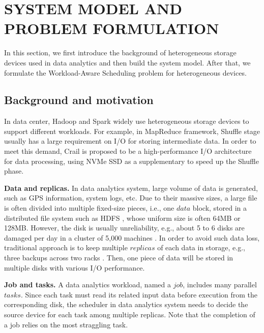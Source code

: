 \documentclass[conference]{IEEEtran}
\begin{document}
\section{SYSTEM MODEL AND PROBLEM FORMULATION}\label{SYSTEM_MODEL}
In this section, we first introduce the background of heterogeneous storage devices used in data analytics and then build the system model. After that, we formulate the Workload-Aware Scheduling problem for heterogeneous devices.

\subsection{Background and motivation}\label{AA}

In data center, Hadoop and Spark widely use heterogeneous storage devices to support different workloads. For example, in MapReduce framework, Shuffle stage \cite{b42} \cite{b41} usually has a large requirement on I/O for storing intermediate data. In order to meet this demand, Crail \cite{b37} is proposed to be a high-performance I/O architecture for data processing, using NVMe SSD as a supplementary to speed up the Shuffle phase.

\textbf{Data and replicas.} In data analytics system, large volume of data is generated, such as GPS information\cite{b38}, system logs\cite{b39}, etc. Due to their massive sizes, a large file is often divided into multiple fixed-size pieces, i.e., one $data$ block, stored in a distributed file system such as HDFS \cite{b19}, whose uniform size is often 64MB or 128MB. However, the disk is usually unreliability, e.g., about 5 to 6 disks are damaged per day in a cluster of 5,000 machines \cite{b32}. In order to avoid such data loss, traditional approach is to keep multiple $replicas$ of each data in storage, e.g., three backups across two racks \cite{b19}. Then, one piece of data will be stored in multiple disks with various I/O performance.

\textbf{Job and tasks.} A data analytics workload, named a $job$, includes many parallel $tasks$. Since each task must read its related input data before execution from the corresponding disk, the scheduler in data analytics system needs to decide the source device for each task among multiple replicas. Note that the completion of a job relies on the most straggling task.
\end{document}
